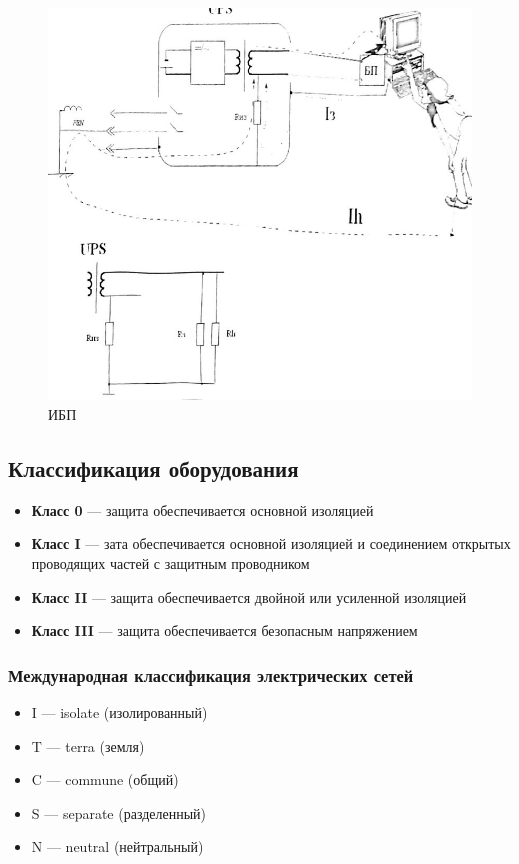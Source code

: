 \documentclass[a4paper, 14pt]{extarticle}
\begin{document}
\begin{itemize}
    \begin{figure}[h]
        \centering
        \includegraphics[width=\textwidth]{./img/L5/S004.jpg}
        \caption{ИБП}
    \end{figure}
\end{itemize}

\FloatBarrier{}
\subsection{Классификация оборудования}
\begin{itemize}
    \item \textbf{Класс 0} --- защита обеспечивается основной изоляцией
    \item \textbf{Класс I} --- зата обеспечивается основной изоляцией и соединением открытых проводящих частей с защитным проводником
    \item \textbf{Класс II} --- защита обеспечивается двойной или усиленной изоляцией
    \item \textbf{Класс III} --- защита обеспечивается безопасным напряжением
\end{itemize}

\subsubsection{Международная классификация электрических сетей}
\begin{itemize}
    \item I --- isolate (изолированный)
    \item T --- terra (земля)
    \item C --- commune (общий)
    \item S --- separate (разделенный)
    \item N --- neutral (нейтральный)
\end{itemize}
\end{document}
